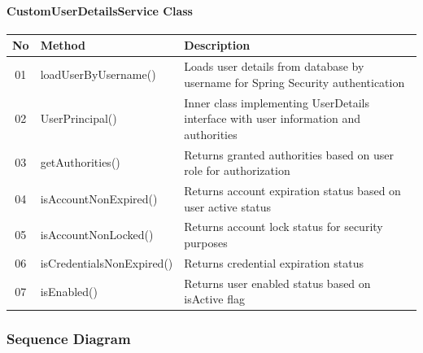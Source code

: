 \documentclass[12pt,a4paper]{article}
\begin{document}
\paragraph{CustomUserDetailsService Class}
\begin{longtable}{|c|l|p{8cm}|}
\hline
\textbf{No} & \textbf{Method} & \textbf{Description} \\
\hline
01 & loadUserByUsername() & Loads user details from database by username for Spring Security authentication \\
\hline
02 & UserPrincipal() & Inner class implementing UserDetails interface with user information and authorities \\
\hline
03 & getAuthorities() & Returns granted authorities based on user role for authorization \\
\hline
04 & isAccountNonExpired() & Returns account expiration status based on user active status \\
\hline
05 & isAccountNonLocked() & Returns account lock status for security purposes \\
\hline
06 & isCredentialsNonExpired() & Returns credential expiration status \\
\hline
07 & isEnabled() & Returns user enabled status based on isActive flag \\
\hline
\end{longtable}

\subsubsection{Sequence Diagram}
\end{document}
